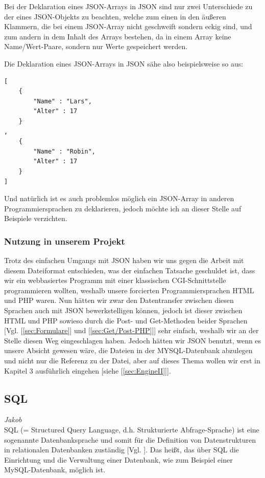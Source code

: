\documentclass[12pt,a4paper,bibliography=totocnumbered,listof=totocnumbered]{scrartcl}
\begin{document}
Bei der Deklaration eines JSON-Arrays in JSON sind nur zwei Unterschiede zu der eines JSON-Objekts zu beachten, welche zum einen in den äußeren Klammern, die bei einem JSON-Array nicht geschweift sondern eckig sind, und zum andern in dem Inhalt des Arrays bestehen, da in einem Array keine Name/Wert-Paare, sondern nur Werte gespeichert werden.

Die Deklaration eines JSON-Arrays in JSON sähe also beispielsweise so aus:
\\
\vspace{1em}
\begin{lstlisting}[caption=Klasse.json, label=lst:json-array]
[
	{
		"Name" : "Lars",
		"Alter" : 17
	}
,
	{
 		"Name" : "Robin",
 		"Alter" : 17
	}
]
\end{lstlisting}

Und natürlich ist es auch problemlos möglich ein JSON-Array in anderen Programmiersprachen zu deklarieren, jedoch möchte ich an dieser Stelle auf Beispiele verzichten.

\subsubsection{Nutzung in unserem Projekt}
Trotz des einfachen Umgangs mit JSON haben wir uns gegen die Arbeit mit diesem Dateiformat entschieden, was der einfachen Tatsache geschuldet ist, dass wir ein webbasiertes Programm mit einer klassischen CGI-Schnittstelle programmieren wollten, weshalb unsere forcierten Programmiersprachen HTML und PHP waren.
Nun hätten wir zwar den Datentransfer zwischen diesen Sprachen auch mit JSON bewerkstelligen können, jedoch ist dieser zwischen HTML und PHP sowieso durch die Post- und Get-Methoden beider Sprachen [Vgl. [\ref{sec:Formulare}] und [\ref{sec:Get/Post-PHP}]] sehr einfach, weshalb wir an der Stelle diesen Weg eingeschlagen haben.
Jedoch hätten wir JSON benutzt, wenn es unsere Absicht gewesen wäre, die Dateien in der MYSQL-Datenbank abzulegen und nicht nur die Referenz zu der Datei, aber auf dieses Thema wollen wir erst in Kapitel 3 ausführlich eingehen [siehe [\ref{sec:EngineII}]].

\subsection{SQL}
\label{sec:SQL}
\emph{Jakob}\\
SQL (= Structured Query Language, d.h. Strukturierte Abfrage-Sprache) ist eine sogenannte \glqq Datenbanksprache\grqq{} und somit für die Definition von Datenstrukturen in relationalen Datenbanken zuständig [Vgl. \cite{wiki/SQL}].
Das heißt, das über SQL die Einrichtung und die Verwaltung einer Datenbank, wie zum Beispiel einer MySQL-Datenbank, möglich ist.
\end{document}
